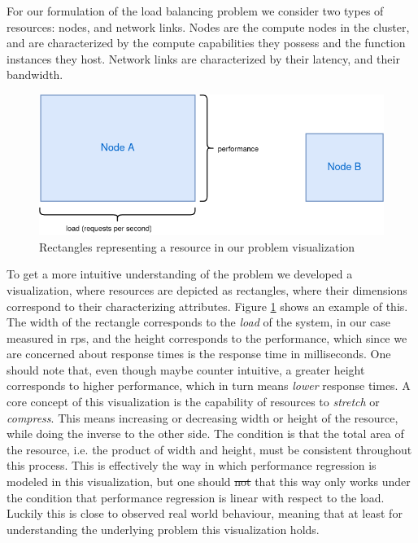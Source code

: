 \documentclass[draft,final]{vutinfth} %
\providecommand{\DIFaddtex}[1]{{\protect\color{blue}\uwave{#1}}} %
\providecommand{\DIFdeltex}[1]{{\protect\color{red}\sout{#1}}}                      %
\providecommand{\DIFaddbegin}{} %
\providecommand{\DIFaddend}{} %
\providecommand{\DIFdelbegin}{} %
\providecommand{\DIFdelend}{} %
\providecommand{\DIFadd}[1]{\texorpdfstring{\DIFaddtex{#1}}{#1}} %
\providecommand{\DIFdel}[1]{\texorpdfstring{\DIFdeltex{#1}}{}} %
\begin{document}
For our formulation of the load balancing problem we consider two types of resources: nodes, and network links. Nodes are the compute nodes in the cluster, and are characterized by the compute capabilities they possess and the function instances they host. Network links are characterized by their latency, and their bandwidth.
\begin{figure}
    \centering
    \includegraphics[width=12cm]{graphics/diagrams/load_balancer_squares.png}
    \caption{Rectangles representing a resource in our problem visualization}
    \label{fig:lb_squares_basic}
\end{figure}
To get a more intuitive understanding of the problem we developed a visualization, where resources are depicted as rectangles, where their dimensions correspond to their characterizing attributes. Figure \ref{fig:lb_squares_basic} shows an example of this. The width of the rectangle corresponds to the \textit{load} of the system, in our case measured in \gls{rps}, and the height corresponds to the performance, which since we are concerned about response times is the response time in milliseconds. One should note that, even though maybe counter intuitive, a greater height corresponds to higher performance, which in turn means \textit{lower} response times.
A core concept of this visualization is the capability of resources to \textit{stretch} or \textit{compress}. This means increasing or decreasing width or height of the resource, while doing the inverse to the other side. The condition is that the total area of the resource, i.e. the product of width and height, must be consistent throughout this process. This is effectively the way in which performance regression is modeled in this visualization, but one should \DIFdelbegin \DIFdel{not }\DIFdelend \DIFaddbegin \DIFadd{note }\DIFaddend that this way only works under the condition that performance regression is linear with respect to the load. Luckily this is close to observed real world behaviour, %
meaning that at least for understanding the underlying problem this visualization holds.
\end{document}
